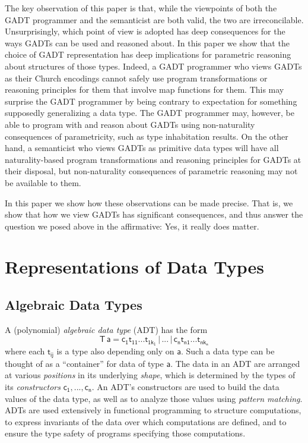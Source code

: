 \documentclass[acmsmall,screen,review,anonymous]{acmart}
\theoremstyle{definition}
\begin{document}
The key observation of this paper is that, while the viewpoints of
both the GADT programmer and the semanticist are both valid, the two
are irreconcilable. Unsurprisingly, which point of view is adopted has
deep consequences for the ways GADTs can be used and reasoned
about. In this paper we show that the choice of GADT representation
has deep implications for parametric reasoning about structures of
those types. Indeed, a GADT programmer who views GADTs as their Church
encodings cannot safely use program transformations or reasoning
principles for them that involve map functions for them. This may
surprise the GADT programmer by being contrary to expectation for
something supposedly generalizing a data type. The GADT programmer
may, however, be able to program with and reason about GADTs using
non-naturality consequences of parametricity, such as type
inhabitation results. On the other hand, a semanticist who views GADTs
as primitive data types will have all naturality-based program
transformations and reasoning principles for GADTs at their disposal,
but non-naturality consequences of parametric reasoning may not be
available to them.

In this paper we show how these observations can be made precise. That
is, we show that how we view GADTs has significant consequences, and
thus answer the question we posed above in the affirmative: Yes, it
really does matter.

\section{Representations of Data Types}\label{sec:reps}

\subsection{Algebraic Data Types}\label{sec:adts}

A (polynomial) {\em algebraic data type} (ADT) has the form
\[\mathsf{T\,a} = \mathsf{c_1 t_{11}}...\mathsf{t_{1k_1}}\, |\, ...\, |\,
\mathsf{c_n t_{n1}}...\mathsf{t_{nk_n}}\] where each $\mathsf{t_{ij}}$
is a type also depending only on $\mathsf{a}$. Such a data type can be
thought of as a ``container'' for data of type $\mathsf{a}$. The data
in an ADT are arranged at various {\em positions} in its underlying
{\em shape}, which is determined by the types of its {\em
  constructors} $\mathsf{c_1},...,\mathsf{c_n}$. An ADT's constructors
are used to build the data values of the data type, as well as to
analyze those values using {\em pattern matching}. ADTs are used
extensively in functional programming to structure computations, to
express invariants of the data over which computations are defined,
and to ensure the type safety of programs specifying those
computations.
\end{document}
